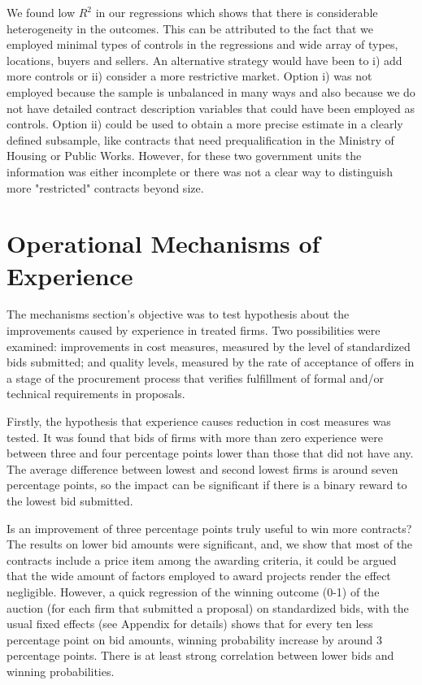 We found low $R^2$ in our regressions which shows that there is considerable heterogeneity in the outcomes. This can be attributed to the fact that we employed minimal types of controls in the regressions and wide array of types, locations, buyers and sellers. An alternative strategy would have been to i) add more controls or ii) consider a more restrictive market. Option i) was not employed because the sample is unbalanced in many ways and also because we do not have detailed contract description variables that could have been employed as controls. Option ii) could be used to obtain a more precise estimate in a clearly defined subsample, like contracts that need prequalification in the Ministry of Housing or Public Works. However, for these two government units the information was either incomplete or there was not a clear way to distinguish more "restricted" contracts beyond size.

\section{Operational Mechanisms of Experience}

The mechanisms section's objective was to test hypothesis about the improvements caused by experience in treated firms. Two possibilities were examined: improvements in cost measures, measured by the level of standardized bids submitted; and  quality levels, measured by the rate of acceptance of offers in a stage of the procurement process that verifies fulfillment of formal and/or technical requirements in proposals.

Firstly, the hypothesis that experience causes reduction in cost measures was tested. It was found that bids of firms with more than zero experience were between three and four percentage points lower than those that did not have any. The average difference between lowest and second lowest firms is around seven percentage points, so the impact can be significant if there is a binary reward to the lowest bid submitted. %

Is an improvement of three percentage points truly useful to win more contracts? The results on lower bid amounts were significant, and, we show that most of the contracts include a price item among the awarding criteria,  it could be argued that the wide amount of factors employed to award projects render the effect negligible. However, a quick regression of the winning outcome (0-1) of the auction (for each firm that submitted a proposal) on standardized bids, with the usual fixed effects (see Appendix for details) shows that for every ten less percentage point on bid amounts, winning probability increase by around 3 percentage points. There is at least strong correlation between lower bids and winning probabilities.

